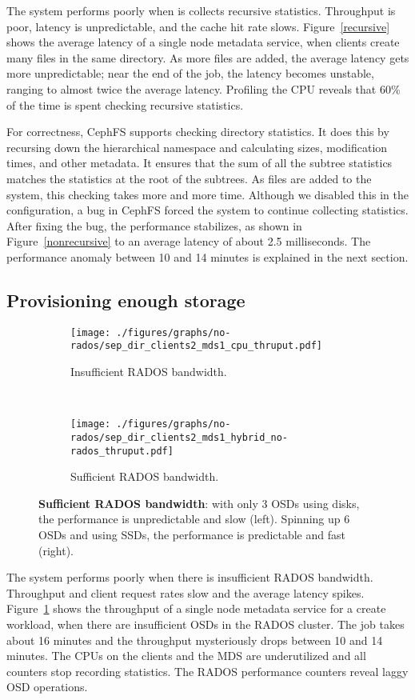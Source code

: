 The system performs poorly when is collects recursive statistics. Throughput is poor, latency is unpredictable, and the cache hit rate slows. Figure~\ref{recursive} shows the average latency of a single node metadata service, when clients create many files in the same directory. As more files are added, the average latency gets more unpredictable; near the end of the job, the latency becomes unstable, ranging to almost twice the average latency. Profiling the CPU reveals that 60\% of the time is spent checking recursive statistics. 

For correctness, CephFS supports checking directory statistics. It does this by recursing down the hierarchical namespace and calculating sizes, modification times, and other metadata. It ensures that the sum of all the subtree statistics matches the statistics at the root of the subtrees. As files are added to the system, this checking takes more and more time. Although we disabled this in the configuration, a bug in CephFS forced the system to continue collecting statistics. After fixing the bug, the performance stabilizes, as shown in Figure~\ref{nonrecursive} to an average latency of about 2.5 milliseconds. The performance anomaly between 10 and 14 minutes is explained in the next section. 

\subsection{Provisioning enough storage}
\begin{figure*}[tbh]
	\begin{subfigure}[H]{0.5\textwidth}
	\centering
	\texttt{[image: ./figures/graphs/no-rados/sep\_dir\_clients2\_mds1\_cpu\_thruput.pdf]}
	\caption{Insufficient RADOS bandwidth.\label{no-rados}}
	\end{subfigure}
	~
	\begin{subfigure}[H]{0.5\textwidth}
	\centering	
	\texttt{[image: ./figures/graphs/no-rados/sep\_dir\_clients2\_mds1\_hybrid\_no-rados\_thruput.pdf]} 
	\caption{Sufficient RADOS bandwidth.\label{rados}}
	\end{subfigure}	
	\caption{\textbf{Sufficient RADOS bandwidth}: with only 3 OSDs using disks, the performance is unpredictable and slow (left). Spinning up 6 OSDs and using SSDs, the performance is predictable and fast (right).\label{rados-no-rados}}
\end{figure*}

The system performs poorly when there is insufficient RADOS bandwidth. Throughput and client request rates slow and the average latency spikes. Figure~\ref{no-rados} shows the throughput of a single node metadata service for a create workload, when there are insufficient OSDs in the RADOS cluster. The job takes about 16 minutes and the throughput mysteriously drops between 10 and 14 minutes. The CPUs on the clients and the MDS are underutilized and all counters stop recording statistics. The RADOS performance counters reveal laggy OSD operations. 

